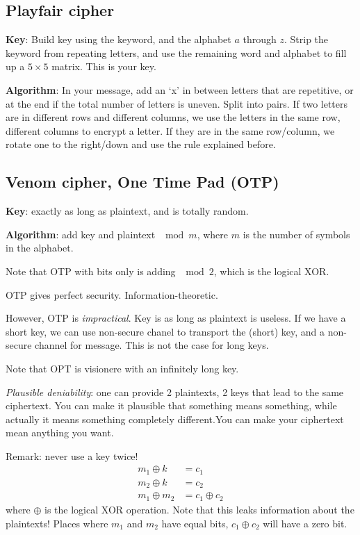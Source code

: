 \documentclass[language=english,number=]{homework}
\begin{document}
    \subsection{Playfair cipher}

    \textbf{Key}: Build key using the keyword, and the alphabet $a$ through $z$.
    Strip the keyword from repeating letters, and use the remaining word and alphabet to fill up a $5 \times 5$ matrix.
    This is your key.

    \textbf{Algorithm}: In your message, add an `x' in between letters that are repetitive, or at the end if the total number of letters is uneven.
    Split into pairs.
    If two letters are in different rows and different columns, we use the letters in the same row, different columns to encrypt a letter.
    If they are in the same row/column, we rotate one to the right/down and use the rule explained before.

    \subsection{Venom cipher, One Time Pad (OTP)}

    \textbf{Key}: exactly as long as plaintext, and is totally random.

    \textbf{Algorithm}: add key and plaintext $\mod m$, where $m$ is the number of symbols in the alphabet.

    Note that OTP with bits only is adding $\mod 2$, which is the logical XOR.

    \begin{theorem}[Shannon]
        OTP gives perfect security.
        Information-theoretic.
    \end{theorem}

    However, OTP is \textit{impractical}.
    Key is as long as plaintext is useless.
    If we have a short key, we can use non-secure chanel to transport the (short) key, and a non-secure channel for message.
    This is not the case for long keys.

    Note that OPT is visionere with an infinitely long key.

    \textit{Plausible deniability}: one can provide 2 plaintexts, 2 keys that lead to the same ciphertext.
    You can make it plausible that something means something, while actually it means something completely different.You can make your ciphertext mean anything you want.

    Remark: never use a key twice!
    \begin{align*}
        m_1 \oplus k &= c_1 \\
        m_2 \oplus k &= c_2 \\
        m_1 \oplus m_2 &= c_1 \oplus c_2
    \end{align*}
    where $\oplus$ is the logical XOR operation.
    Note that this leaks information about the plaintexts!
    Places where $m_1$ and $m_2$ have equal bits, $c_1 \oplus c_2$ will have a zero bit.
\end{document}
